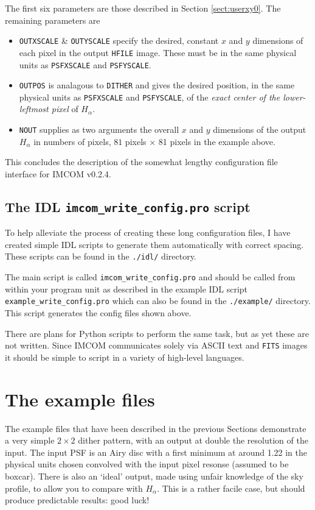 \documentclass[10pt]{article}
\begin{document}
The first six parameters are those described in Section \ref{sect:userxy0}. The remaining parameters are
\begin{itemize}
\item \texttt{OUTXSCALE} \& \texttt{OUTYSCALE} specify the desired, constant $x$ and $y$ dimensions of each pixel in the output \texttt{HFILE} image. These must be in the same physical units as \texttt{PSFXSCALE} and \texttt{PSFYSCALE}.
\item \texttt{OUTPOS} is analagous to \texttt{DITHER} and gives the desired position, in the same physical units as \texttt{PSFXSCALE} and \texttt{PSFYSCALE}, of the \emph{exact center of the lower-leftmost pixel} of $H_{\alpha}$.
\item \texttt{NOUT} supplies as two arguments the overall $x$ and $y$ dimensions of the output $H_{\alpha}$ in numbers of pixels, $81$ pixels $\times$ 81 pixels in the example above.
\end{itemize}

This concludes the description of the somewhat lengthy configuration file interface for IMCOM v0.2.4.  

\subsection{The IDL \texttt{imcom\_write\_config.pro} script}\label{sect:idl}
To help alleviate the process of creating these long configuration files, I have created simple IDL scripts to generate them automatically with correct spacing.  These scripts can be found in the \texttt{./idl/} directory. 

The main script is called \texttt{imcom\_write\_config.pro} and should be called from within your program unit as described in the example IDL script \texttt{example\_write\_config.pro} which can also be found in the \texttt{./example/} directory.  This script generates the config files shown above.

There are plans for Python scripts to perform the same task, but as yet these are not written.  Since IMCOM communicates solely via ASCII text and \texttt{FITS} images it should be simple to script in a variety of high-level languages.

\section{The example files}
The example files that have been described in the previous Sections demonstrate a very simple $2 \times 2$ dither pattern, with an output at double the resolution of the input.  The input PSF is an Airy disc with a first minimum at around 1.22 in the physical units chosen convolved with the input pixel resonse (assumed to be boxcar).  There is also an `ideal' output, made using unfair knowledge of the sky profile, to allow you to compare with $H_{\alpha}$.  This is a rather facile case, but should produce predictable results: good luck!
\end{document}

